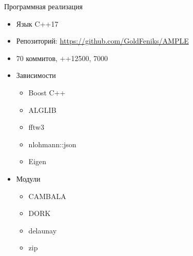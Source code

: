 \documentclass{fefu_presentation}
\begin{document}
     \begin{frame}{Программная реализация}
         \begin{block}{}
             \begin{itemize}
                 \item Язык C++17
                 \item Репозиторий: {\footnotesize \url{https://github.com/GoldFeniks/AMPLE}}
                 \item 70 коммитов, \textcolor{greenish}{++}12500, \textcolor{redish}{\textminus\textminus}7000
                 \item Зависимости
                 \begin{itemize}
                     \item Boost C++
                     \item ALGLIB
                     \item fftw3
                     \item nlohmann::json
                     \item Eigen
                 \end{itemize}
                 \item Модули
                 \begin{itemize}
                     \item CAMBALA
                     \item DORK
                     \item delaunay
                     \item zip
                 \end{itemize}
             \end{itemize}
         \end{block}
     \end{frame}
    
\end{document}
